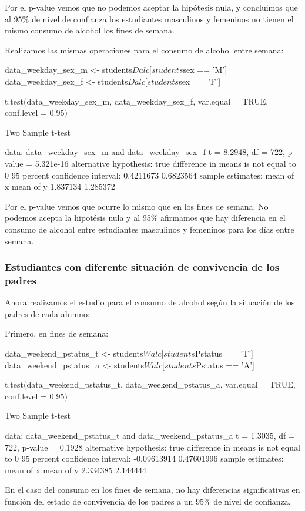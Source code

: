 \documentclass[12pt,a4paper]{article}
\begin{document}
Por el p-value vemos que no podemos aceptar la hipótesis nula, y concluimos que al 95\% de nivel de confianza los estudiantes masculinos y femeninos no tienen el mismo consumo de alcohol los fines de semana. 


Realizamos las mismas operaciones para el consumo de alcohol entre semana:

\begin{spverbatim}
data_weekday_sex_m <- students$Dalc[students$sex == 'M'] 
data_weekday_sex_f <- students$Dalc[students$sex == 'F'] 

t.test(data_weekday_sex_m, data_weekday_sex_f, var.equal = TRUE, conf.level = 0.95)

Two Sample t-test

data:  data_weekday_sex_m and data_weekday_sex_f
t = 8.2948, df = 722, p-value = 5.321e-16
alternative hypothesis: true difference in means is not equal to 0
95 percent confidence interval:
 0.4211673 0.6823564
sample estimates:
mean of x mean of y 
 1.837134  1.285372

\end{spverbatim}

Por el p-value vemos que ocurre lo mismo que en los fines de semana. No podemos acepta la hipotésis nula y al 95\% afirmamos que hay diferencia en el consumo de alcohol entre estudiantes masculinos y femeninos para los días entre semana.


\subsubsection{Estudiantes con diferente situación de convivencia de los padres}

Ahora realizamos el estudio para el consumo de alcohol según la situación de los padres de cada alumno:

Primero, en fines de semana:
\begin{spverbatim}
data_weekend_pstatus_t <- students$Walc[students$Pstatus == 'T'] 
data_weekend_pstatus_a <- students$Walc[students$Pstatus == 'A'] 

t.test(data_weekend_pstatus_t, data_weekend_pstatus_a, var.equal = TRUE, conf.level = 0.95)

Two Sample t-test

data:  data_weekend_pstatus_t and data_weekend_pstatus_a
t = 1.3035, df = 722, p-value = 0.1928
alternative hypothesis: true difference in means is not equal to 0
95 percent confidence interval:
 -0.09613914  0.47601996
sample estimates:
mean of x mean of y 
 2.334385  2.144444

\end{spverbatim}
En el caso del consumo en los fines de semana, no hay diferencias significativas en función del estado de convivencia de los padres a un 95\% de nivel de confianza.
\end{document}
